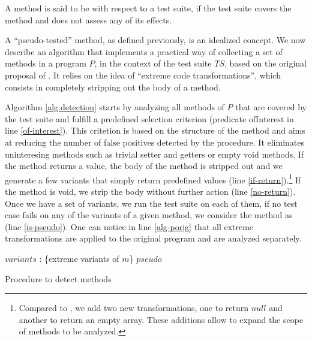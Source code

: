 \begin{definition}
	\label{def:pseudo}
	A method is said to be \pseudotested{} with respect to a test suite, if the test suite covers the method and does not assess any of its effects.
\end{definition}

A ``pseudo-tested'' method, as defined previously, is an idealized concept.
We now describe an algorithm that implements a practical way of collecting a set of \pseudotested{} methods in a program $P$, in the context of the test suite $TS$, based on the original proposal of \theoriginalauthors. 
It relies on the idea of ``extreme code transformations'', which consists in completely stripping out the body of a method.

Algorithm \autoref{alg:detection} starts by analyzing all methods of $P$ that are covered by the test suite and fulfill a predefined selection criterion (predicate $\mathrm{ofInterest}$ in line \ref{of-interest}).
This critetion is based on the structure of the method and aims at reducing the number of false positives detected by the procedure. 
It eliminates uninteresing methods such as trivial setter and getters or empty void methods.
If the method returns a value, the body of the method is stripped out and we generate a few variants that simply return predefined values (line \ref{if-return}).\footnote{Compared to \theoriginalauthors, we add two new transformations, one to return $null$ and another to return an empty array. These additions allow to expand the scope of methods to be analyzed.}
If the method is void, we strip the body without further action (line \ref{no-return}).
Once we have a set of variants, we run the test suite on each of them, if no test case fails on any of the variants of a given method, we consider the method as \pseudotested{} (line \ref{is-pseudo}). 
One can notice in line \ref{alg-porig} that all extreme transformations are applied to the original program and are analyzed separately.

\begin{algorithm}[t]
	\begin{algorithmic}[1]
		\label{of-interest}
			\State $variants$ : \{extreme variants of $m$\}
			\label{if-return}
			\Else\label{no-return}
			\EndIf
		\EndFor
			\label{alg-porig}
			\label{is-pseudo}
			\EndIf
		\EndFor
		\Return $pseudo$
	\end{algorithmic}
	\caption{Procedure to detect \pseudotested{} methods}
	\label{alg:detection}
\end{algorithm}

